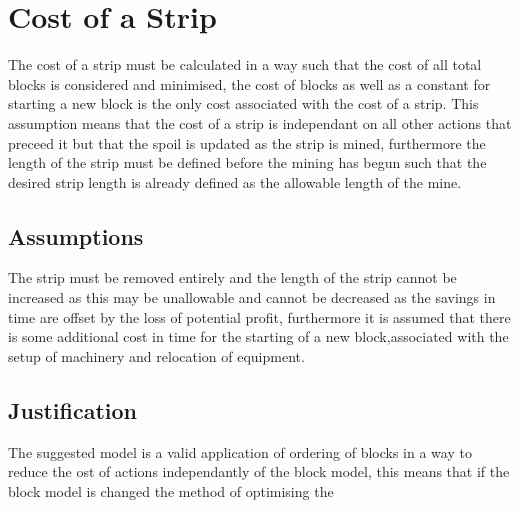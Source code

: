\section{Cost of a Strip}
The cost of a strip must be calculated in a way such that the cost of all total blocks is considered and minimised, the cost of blocks as well as a constant for starting a new block is the only cost associated with the cost of a strip. This assumption means that the cost of a strip is independant on all other actions that preceed it but that the spoil is updated as the strip is mined, furthermore the length of the strip must be defined before the mining has begun such that the desired strip length is already defined as the allowable length of the mine. 
\subsection{Assumptions} 
The strip must be removed entirely and the length of the strip cannot be increased as this may be unallowable and cannot be decreased as the savings in time are offset by the loss of potential profit, furthermore it is assumed that there is some additional cost in time for the starting of a new block,associated with the setup of machinery and relocation of equipment. 
\subsection{Justification}
The suggested model is a valid application of ordering of blocks in a way to reduce the ost of actions independantly of the block model, this means that if the block model is changed the method of optimising the 

